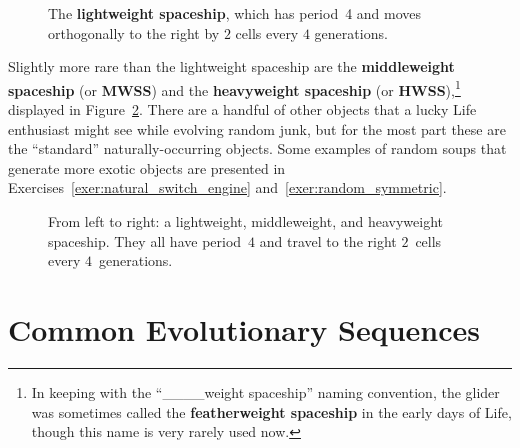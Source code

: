 \begin{figure}[!htb]
	\centering{}
	\caption{The \textbf{lightweight spaceship}, which has period~4 and moves orthogonally to the right by $2$ cells every $4$ generations.}\label{fig:lwss}
\end{figure}

Slightly more rare than the lightweight spaceship are the \textbf{middleweight spaceship} (or \textbf{MWSS}) and the \textbf{heavyweight spaceship} (or \textbf{HWSS}),\footnote{In keeping with the ``\_\_\_\_weight spaceship'' naming convention, the glider was sometimes called the \textbf{featherweight spaceship} in the early days of Life, though this name is very rarely used now.} displayed in Figure~\ref{fig:lwss_mwss_hwss}. There are a handful of other objects that a lucky Life enthusiast might see while evolving random junk, but for the most part these are the ``standard'' naturally-occurring objects. Some examples of random soups that generate more exotic objects are presented in Exercises~\ref{exer:natural_switch_engine} and~\ref{exer:random_symmetric}.

\begin{figure}[!htb]
	\centering{}
	\caption{From left to right: a lightweight, middleweight, and heavyweight spaceship. They all have period~$4$ and travel to the right $2$~cells every $4$~generations.}\label{fig:lwss_mwss_hwss}
\end{figure}


\section{Common Evolutionary Sequences}\label{sec:evolution}

